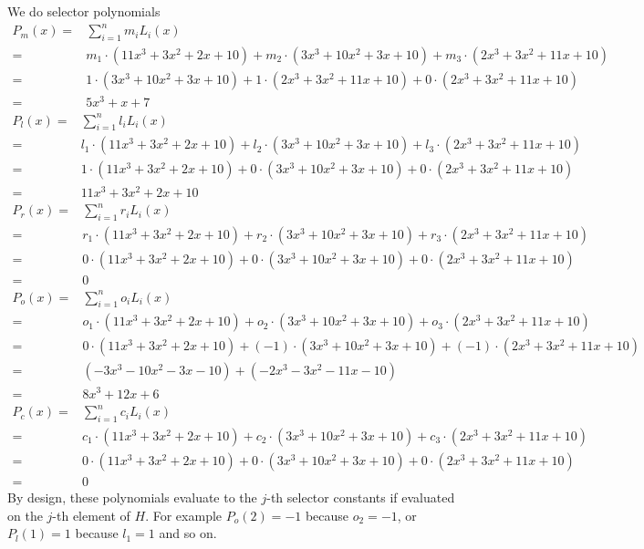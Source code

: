 \begin{example}
We do selector polynomials
$$
\begin{array}{rl}
P_{m}(x) = & \sum_{i=1}^{n} {m_i}L_i(x)\\         
         = & m_1\cdot(11x^3 +3x^2 +2x + 10) + m_2\cdot (3x^3 +10x^2+ 3x + 10) + m_3\cdot (2x^3 + 3x^2 +11x +10) \\        
         = &  1\cdot (3x^3 +10x^2+ 3x + 10) + 1\cdot (2x^3 + 3x^2 +11x +10) +  0 \cdot (2x^3 + 3x^2 +11x +10)\\
         = & 5x^3 + x + 7
\end{array}
$$
$$
\begin{array}{rl}
P_{l}(x) = & \sum_{i=1}^{n} {l_i}L_i(x)\\         
         = & l_1\cdot(11x^3 +3x^2 +2x + 10) + l_2\cdot (3x^3 +10x^2+ 3x + 10) + l_3\cdot (2x^3 + 3x^2 +11x +10) \\            
         = & 1\cdot(11x^3 +3x^2 +2x + 10) + 0\cdot (3x^3 +10x^2+ 3x + 10) + 0\cdot (2x^3 + 3x^2 +11x +10) \\ 
         = & 11x^3 +3x^2 +2x + 10 
\end{array}
$$
$$
\begin{array}{rl}
P_{r}(x) = & \sum_{i=1}^{n} {r_i}L_i(x)\\         
         = & r_1\cdot(11x^3 +3x^2 +2x + 10) + r_2\cdot (3x^3 +10x^2+ 3x + 10) + r_3\cdot (2x^3 + 3x^2 +11x +10) \\ 
         = & 0\cdot(11x^3 +3x^2 +2x + 10) + 0\cdot (3x^3 +10x^2+ 3x + 10) + 0\cdot (2x^3 + 3x^2 +11x +10) \\          
         = & 0          
\end{array}
$$
$$
\begin{array}{rl}
P_{o}(x) = & \sum_{i=1}^{n} {o_i}L_i(x)\\         
         = & o_1\cdot(11x^3 +3x^2 +2x + 10) + o_2\cdot (3x^3 +10x^2+ 3x + 10) + o_3\cdot (2x^3 + 3x^2 +11x +10) \\
         = & 0\cdot(11x^3 +3x^2 +2x + 10) + (-1)\cdot (3x^3 +10x^2+ 3x + 10) + (-1)\cdot (2x^3 + 3x^2 +11x +10) \\  
         = & (-3x^3 -10x^2 - 3x - 10) + (-2x^3 - 3x^2 -11x -10) \\ 
         = & 8x^3 + 12x + 6              
\end{array}
$$
$$
\begin{array}{rl}
P_{c}(x) = & \sum_{i=1}^{n} {c_i}L_i(x)\\         
         = & c_1\cdot(11x^3 +3x^2 +2x + 10) + c_2\cdot (3x^3 +10x^2+ 3x + 10) + c_3\cdot (2x^3 + 3x^2 +11x +10) \\
         = & 0\cdot(11x^3 +3x^2 +2x + 10) + 0\cdot (3x^3 +10x^2+ 3x + 10) + 0\cdot (2x^3 + 3x^2 +11x +10) \\
         = & 0          
\end{array}
$$
By design, these polynomials evaluate to the $j$-th selector constants if evaluated on the $j$-th element of $H$. For example $P_o(2)=-1$ because $o_2=-1$, or $P_l(1)=1$ because $l_1=1$ and so on. 


\end{example}
